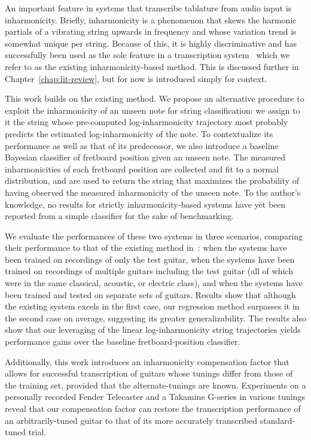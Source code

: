 \documentclass[12pt]{cmuthesis}
\begin{document}
An important feature in systems that transcribe tablature from audio input is inharmonicity. Briefly, inharmonicity is a phenomenon that skews the harmonic partials of a vibrating string upwards in frequency and whose variation trend is somewhat unique per string. Because of this, it is highly discriminative and has successfully been used as the sole feature in a transcription system~\cite{barbanchoi2012} which we refer to as the existing inharmonicity-based method. This is discussed further in Chapter~\ref{chap:lit-review}, but for now is introduced simply for context.

This work builds on the existing method. We propose an alternative procedure to exploit the inharmonicity of an unseen note for string classification: we assign to it the string whose pre-computed log-inharmonicity trajectory most probably predicts the estimated log-inharmonicity of the note. To contextualize its performance as well as that of its predecessor, we also introduce a baseline Bayesian classifier of fretboard position given an unseen note. The measured inharmonicities of each fretboard position are collected and fit to a normal distribution, and are used to return the string that maximizes the probability of having observed the measured inharmonicity of the unseen note. To the author's knowledge, no results for strictly inharmonicity-based systems have yet been reported from a simple classifier for the sake of benchmarking. 

We evaluate the performances of these two systems in three scenarios, comparing their performance to that of the existing method in~\cite{barbanchoi2012}: when the systems have been trained on recordings of only the test guitar, when the systems have been trained on recordings of multiple guitars including the test guitar (all of which were in the same classical, acoustic, or electric class), and when the systems have been trained and tested on separate sets of guitars. Results show that although the existing system excels in the first case, our regression method surpasses it in the second case on average, suggesting its greater generalizability. The results also show that our leveraging of the linear log-inharmonicity string trajectories yields performance gains over the baseline fretboard-position classifier.

Additionally, this work introduces an inharmonicity compensation factor that allows for successful transcription of guitars whose tunings differ from those of the training set, provided that the alternate-tunings are known. Experiments on a personally recorded Fender Telecaster and a Takamine G-series in various tunings reveal that our compensation factor can restore the transcription performance of an arbitrarily-tuned guitar to that of its more accurately transcribed standard-tuned trial.
\end{document}
